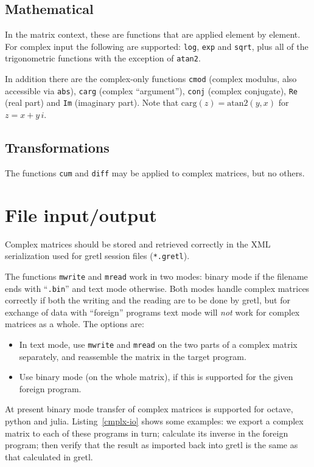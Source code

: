 \documentclass{article}
\begin{document}
\subsection{Mathematical}

In the matrix context, these are functions that are applied element by
element. For complex input the following are supported: \texttt{log},
\texttt{exp} and \texttt{sqrt}, plus all of the trigonometric
functions with the exception of \texttt{atan2}.

In addition there are the complex-only functions \texttt{cmod}
(complex modulus, also accessible via \texttt{abs}), \texttt{carg}
(complex ``argument''), \texttt{conj} (complex conjugate), \texttt{Re}
(real part) and \texttt{Im} (imaginary part). Note that
$\mbox{carg}(z) = \mbox{atan2}(y,x)$ for $z=x + y\,i$.

\subsection{Transformations}

The functions \texttt{cum} and \texttt{diff} may be applied to complex
matrices, but no others.

\section{File input/output}

Complex matrices should be stored and retrieved correctly in the
XML serialization used for gretl session files (\texttt{*.gretl}).

The functions \texttt{mwrite} and \texttt{mread} work in two modes:
binary mode if the filename ends with ``\texttt{.bin}'' and text mode
otherwise. Both modes handle complex matrices correctly if both the
writing and the reading are to be done by gretl, but for exchange of
data with ``foreign'' programs text mode will \textit{not} work for
complex matrices as a whole. The options are:
\begin{itemize}
\item In text mode, use \texttt{mwrite} and \texttt{mread} on the two
  parts of a complex matrix separately, and reassemble the matrix in
  the target program.
\item Use binary mode (on the whole matrix), if this is supported for
  the given foreign program.
\end{itemize}

At present binary mode transfer of complex matrices is supported for
\textsf{octave}, \textsf{python} and \textsf{julia}.
Listing~\ref{cmplx-io} shows some examples: we export a complex matrix
to each of these programs in turn; calculate its inverse in the
foreign program; then verify that the result as imported back into
gretl is the same as that calculated in gretl.
\end{document}
